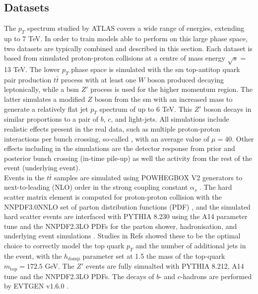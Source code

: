 \subsection{Datasets}\label{ftagdatasets}
The $p_T$ spectrum studied by ATLAS covers a wide range of energies, extending up to 7 TeV. In order to train models able to perform on this large phase space, two datasets are typically combined and described in this section. Each dataset is based from simulated proton-proton collisions at a centre of mass energy $\sqrt{s}$ = 13 TeV. The lower $p_T$ phase space is simulated with the \gls{sm} top-antitop quark pair production $t\bar{t}$ process with at least one $W$ boson produced decaying leptonically, while a \gls{bsm} $Z'$ process is used for the higher momentum region. The latter simulates a modified $Z$ boson from the \gls{sm} with an increased mass to generate a relatively flat jet $p_T$ spectrum of up to 6 TeV. This $Z'$ boson decays in similar proportions to a pair of $b$, $c$, and light-jets. All simulations include realistic effects present in the real data, such as multiple proton-proton interactions per bunch crossing, so-called , with an average value of $\mu = 40$. Other effects including in the simulations are the detector response from prior and posterior bunch crossing (in-time pile-up) as well the activity from the rest of the event (underlying event). \\

Events in the $t\bar{t}$ samples are simulated using \uppercase{POWHEGBOX V2} generators to next-to-leading (NLO) order in the strong coupling constant $\alpha_s$ \cite{PaoloNason_2004, StefanoFrixione_2007, StefanoFrixione_20072, POWHEGBOX}. The hard scatter matrix element is computed for proton-proton collision with the \uppercase{NNPDF3.0NNLO} set of parton distribution functions (PDF) \cite{PDFLHCrun2}, and the simulated hard scatter events are interfaced with \uppercase{PYTHIA 8.230} \cite{SJOSTRAND2015159} using the A14 parameter tune \cite{ATL-PHYS-PUB-2014-021} and the \uppercase{NNPDF2.3LO} PDFs for the parton shower, hadronisation, and underlying event simulations \cite{BALL2013244}. Studies in Refs \cite{ATL-PHYS-PUB-2016-020, ATL-PHYS-PUB-2020-023} showed these to be the optimal choice to correctly model the top quark $p_T$ and the number of additional jets in the event, with the $h_{\textrm{damp}}$ parameter set at 1.5 the mass of the top-quark $m_{\textrm{top}} = 172.5$ GeV. The $Z'$ events are fully simualted with \uppercase{PYTHIA 8.212}, A14 tune and the \uppercase{NNPDF2.3LO} PDFs. The decays of $b$- and $c$-hadrons are performed by \uppercase{EvtGEN} v1.6.0 \cite{LANGE2001152}. \\

